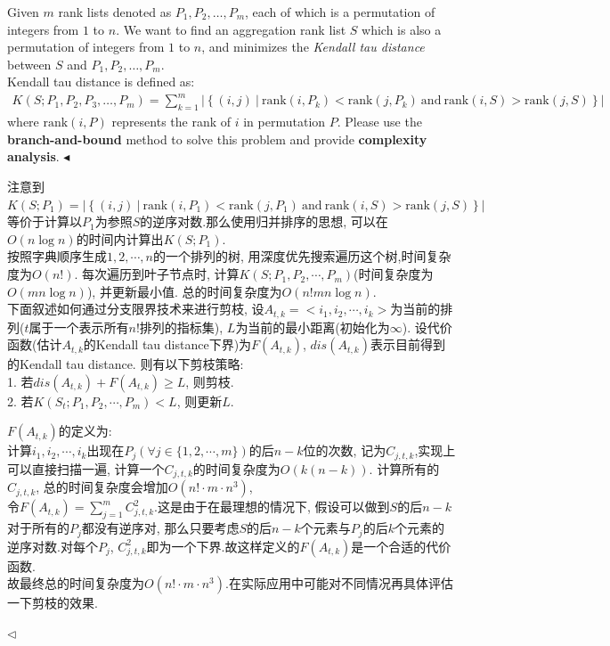 \documentclass[11pt]{article}
\newenvironment{problem}[2][Problem]{\begin{trivlist}
\item[\hskip \labelsep{\bfseries#1}\hskip\labelsep{\bfseries#2.}]}{\hfill$\blacktriangleleft$\end{trivlist}}
\newenvironment{answer}[1][Answer]{\begin{trivlist}
\item[\hskip \labelsep{\bfseries\itshape#1.}\hskip \labelsep]}{\hfill$\lhd$\end{trivlist}}
\begin{document}
\begin{problem}{3. (Minimizing Kendall tau distance)}
    Given $m$ rank lists denoted as $P_1, P_2, \dots, P_m$, each of which is a permutation of integers from $1$ to $n$. We want to find an aggregation rank list $S$ which is also a permutation of integers from $1$ to $n$, and minimizes the \textit{Kendall tau distance} between $S$ and $P_1, P_2, \dots, P_m$.
    \\Kendall tau distance is defined as:
    \begin{align*}
        K(S;P_1,P_2,P_3,\dots,P_m) = \sum_{k=1}^{m} |\left\{(i,j)\ |\ \mathrm{rank}(i,P_k)<\mathrm{rank}(j,P_k)\ \mathrm{and}\ \mathrm{rank}(i,S) > \mathrm{rank}(j,S)\right\}| 
    \end{align*}
    where $\mathrm{rank}(i,P)$ represents the rank of $i$ in permutation $P$.
    Please use the \textbf{branch-and-bound} method to solve this problem and provide \textbf{complexity analysis}.
\end{problem}
\begin{answer}
注意到$K(S;P_1) = |\left\{(i,j)\ |\ \mathrm{rank}(i,P_1)<\mathrm{rank}(j,P_1)\ \mathrm{and}\ \mathrm{rank}(i,S) > \mathrm{rank}(j,S)\right\}| $等价于计算以$P_1$为参照$S$的逆序对数.那么使用归并排序的思想, 可以在$O(n\log n)$的时间内计算出$K(S;P_1)$.
\\按照字典顺序生成$1, 2, \cdots, n$的一个排列的树, 用深度优先搜索遍历这个树,时间复杂度为$O(n!)$. 每次遍历到叶子节点时, 计算$K(S;P_1, P_2, \cdots, P_m)$(时间复杂度为$O(m n\log n)$), 并更新最小值. 总的时间复杂度为$O(n! m n \log n)$.
\\下面叙述如何通过分支限界技术来进行剪枝, 设$A_{t,k} = <i_1, i_2, \cdots, i_k>$为当前的排列($t$属于一个表示所有$n!$排列的指标集), $L$为当前的最小距离(初始化为$\infty$). 设代价函数(估计$A_{t,k}$的Kendall tau distance下界)为$F(A_{t,k})$, $dis(A_{t,k})$表示目前得到的Kendall tau distance. 则有以下剪枝策略:
\\1. 若$dis(A_{t,k}) + F(A_{t,k})\ge L$, 则剪枝.
\\2. 若$K(S_t;P_1, P_2, \cdots, P_m) < L $, 则更新$L$.

$F(A_{t,k})$的定义为: 
\\计算$i_1, i_2, \cdots, i_k$出现在$P_j(\forall j \in \{1,2,\cdots, m\})$的后$n-k$位的次数, 记为$C_{j,t,k}$,实现上可以直接扫描一遍, 计算一个$C_{j,t,k}$的时间复杂度为$O(k(n-k))$. 计算所有的$C_{j,t,k}$, 总的时间复杂度会增加$O(n!\cdot m\cdot n^3 )$,
\\令$F(A_{t,k}) = \sum_{j=1}^{m} C_{j,t,k}^2$.这是由于在最理想的情况下, 假设可以做到$S$的后$n-k$对于所有的$P_j$都没有逆序对, 那么只要考虑$S$的后$n-k$个元素与$P_j$的后$k$个元素的逆序对数.对每个$P_j$, $C_{j,t,k}^2$即为一个下界.故这样定义的$F(A_{t,k})$是一个合适的代价函数.
\\ 故最终总的时间复杂度为$O(n!\cdot m\cdot n^3)$.在实际应用中可能对不同情况再具体评估一下剪枝的效果.

\end{answer}
\end{document}
